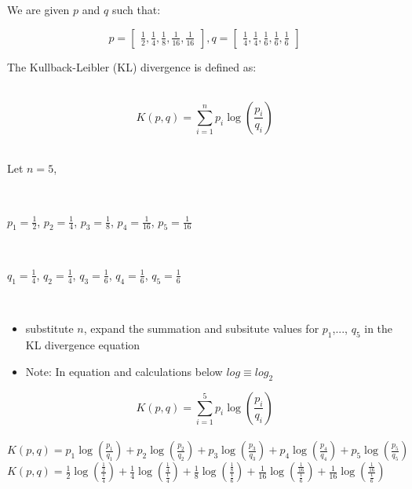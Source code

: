 \documentclass{article}
\begin{document}
\parbox{\textwidth}{We are given $p$ and $q$ such that:}

$$p =\begin{bmatrix}
    \frac{1}{2} , \frac{1}{4} , \frac{1}{8} , \frac{1}{16} , \frac{1}{16}
\end{bmatrix} , q = \begin{bmatrix}
    \frac{1}{4} , \frac{1}{4} , \frac{1}{6} , \frac{1}{6} , \frac{1}{6}
\end{bmatrix}$$

\parbox{\textwidth}{The Kullback-Leibler (KL) divergence is defined as:}\\

$$K(p,q) = \sum^n_{i=1} p_i \log\left(\frac{p_i}{q_i}\right)$$\\


\parbox{\textwidth}{Let $n = 5$,}\\

\parbox{\textwidth}{$p_1 = \frac{1}{2}$, $p_2 = \frac{1}{4}$, $p_3 = \frac{1}{8}$, $p_4 = \frac{1}{16}$, $p_5 = \frac{1}{16}$}\\

\parbox{\textwidth}{$q_1 = \frac{1}{4}$, $q_2 = \frac{1}{4}$, $q_3 = \frac{1}{6}$, $q_4 = \frac{1}{6}$, $q_5 = \frac{1}{6}$}\\

\begin{itemize}
    \item {substitute $n$, expand the summation and subsitute values for $p_1$,..., $q_5$ in the KL divergence equation}\\
    \item Note: In equation and calculations below $log \equiv log_2$
\end{itemize}

$$K(p,q) = \sum^5_{i=1} p_i \log\left(\frac{p_i}{q_i}\right)$$\\

$K(p,q) = p_1 \log\left(\frac{p_1}{q_1}\right) + p_2 \log\left(\frac{p_2}{q_2}\right) + p_3 \log\left(\frac{p_3}{q_3}\right) + p_4 \log\left(\frac{p_4}{q_4}\right) + p_5 \log\left(\frac{p_5}{q_5}\right)$\\

$K(p,q) = \frac{1}{2} \log\left(\frac{\frac{1}{2}}{\frac{1}{4}}\right) + \frac{1}{4} \log\left(\frac{\frac{1}{4}}{\frac{1}{4}}\right) + \frac{1}{8} \log\left(\frac{\frac{1}{8}}{\frac{1}{6}}\right) + \frac{1}{16} \log\left(\frac{\frac{1}{16}}{\frac{1}{6}}\right) + \frac{1}{16} \log\left(\frac{\frac{1}{16}}{\frac{1}{6}}\right)$\\
\end{document}

